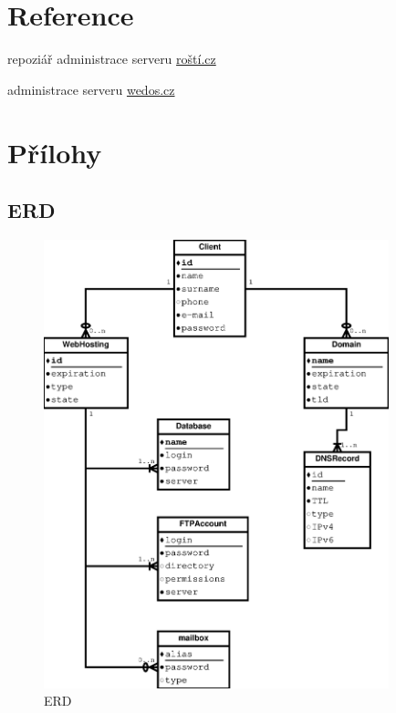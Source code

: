 \documentclass[11pt,a4paper]{article}
\begin{document}

  \section{Reference}

    \begin{enumerate}[label={[\arabic*]}]
      \item repoziář administrace serveru \href{https://github.com/creckx/pcp}{roští.cz}
      \item administrace serveru \href{https://wedos.cz}{wedos.cz}
    \end{enumerate}

  \appendix
  \newpage

  \section{Přílohy}

    \subsection{ERD}

    \begin{figure}[ht]
      \begin{center}
        \includegraphics[width=10cm]{erd}
        \caption{ERD}
      \end{center}
    \end{figure}
\end{document}
